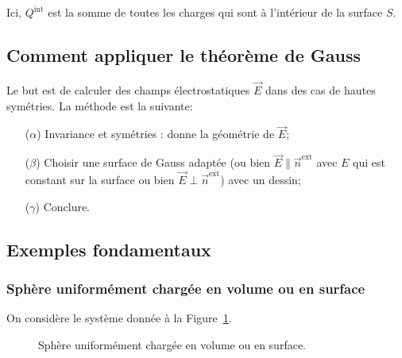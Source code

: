             Ici, $Q^{\text{int}}$ est la somme de toutes les charges qui sont à l'intérieur de la surface $S$.

    \subsection{Comment appliquer le théorème de Gauss}

        Le but est de calculer des champs électrostatiques $\vec{E}$ dans des cas de hautes symétries. La méthode est la suivante:
        \begin{itemize}
            \item [($\alpha$)] Invariance et symétries : donne la géométrie de $\vec{E}$;
            \item [($\beta$)] Choisir une surface de Gauss adaptée (ou bien $\vec{E}\parallel\vec{n}^{\text{ext}}$ avec $E$ qui est constant sur la surface ou bien $\vec{E}\perp\vec{n}^{\text{ext}}$) avec un dessin;
            \item [($\gamma$)] Conclure.
        \end{itemize}

    \subsection{Exemples fondamentaux}
        \subsubsection{Sphère uniformément chargée en volume ou en surface}

            On considère le système donnée à la Figure~\ref{fig:sphere_uniformement_chargee_volume_surface}.
            \begin{figure}
                \centering
                \caption{Sphère uniformément chargée en volume ou en surface.}    
                \label{fig:sphere_uniformement_chargee_volume_surface}
            \end{figure}

